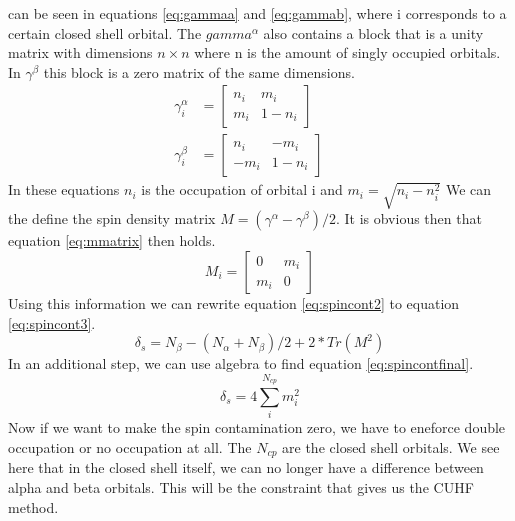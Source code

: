 \documentclass[twoside,twocolumn,9pt]{article}
\begin{document}
can be seen in equations \eqref{eq:gammaa} and \eqref{eq:gammab}, where i corresponds to a certain closed shell orbital. The $gamma^\alpha$ also contains a block that is a 
unity matrix with dimensions $n\times n$ where n is the amount of singly occupied orbitals. In $\gamma^\beta$ this block is a zero matrix of the same dimensions.
\begin{subequations}
  \begin{align}
  \label{eq:gammaa}
  \gamma^\alpha_i &= \begin{bmatrix}
    n_i & m_i \\
    m_i & 1- n_i
  \end{bmatrix}&& \\
  \label{eq:gammab}
  \gamma^\beta_i &= \begin{bmatrix}
    n_i & -m_i \\
    -m_i & 1-n_i
  \end{bmatrix}&&
\end{align}
\end{subequations}
 In these equations $n_i$ is the occupation of orbital i and $m_i = \sqrt{n_i - n_i^2}$\cite{Scuseria2010} We can the define the spin density matrix $M = (\gamma^\alpha - \gamma^\beta)/2$. It is obvious then that equation \eqref{eq:mmatrix} then holds.
 \begin{equation}\label{eq:mmatrix}
   M_i = \begin{bmatrix}
     0 & m_i \\
     m_i & 0
   \end{bmatrix}
 \end{equation}
Using this information we can rewrite equation \eqref{eq:spincont2} to equation \eqref{eq:spincont3}\cite{Scuseria2010}.
\begin{equation}\label{eq:spincont3}
  \delta_s = N_\beta - (N_\alpha + N_\beta)/2 + 2*Tr(M^2)
\end{equation}
In an additional step, we can use algebra to find equation \eqref{eq:spincontfinal}.
\begin{equation}
  \delta_s = 4\sum^{N_{cp}}_i m_i^2
\end{equation}
Now if we want to make the spin contamination zero, we have to eneforce double occupation or no occupation at all. The $N_{cp}$ are the closed shell orbitals. We see here that in 
the closed shell itself, we can no longer have a difference between alpha and beta orbitals. This will be the constraint that gives us the CUHF method.
\end{document}
